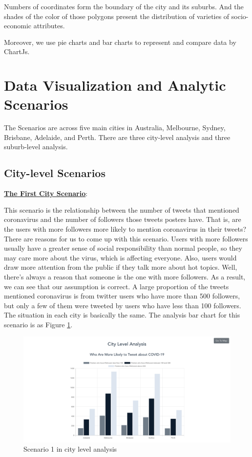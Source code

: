 \documentclass{article}
\begin{document}
Numbers of coordinates form the boundary of the city and its suburbs. And the shades of the color of those polygons present the distribution of varieties of socio-economic attributes. 

Moreover, we use pie charts and bar charts to represent and compare data by ChartJs.

\section{Data Visualization and Analytic Scenarios}
The Scenarios are across five main cities in Australia, Melbourne, Sydney, Brisbane, Adelaide, and Perth. There are three city-level analysis and three suburb-level analysis.
\subsection{City-level Scenarios}
\textbf{\underline{The First City Scenario}}: 

This scenario is the relationship between the number of tweets that mentioned coronavirus and the number of followers those tweets posters have. That is, are the users with more followers more likely to mention coronavirus in their tweets? There are reasons for us to come up with this scenario. Users with more followers usually have a greater sense of social responsibility than normal people, so they may care more about the virus, which is affecting everyone. Also, users would draw more attention from the public if they talk more about hot topics. Well, there’s always a reason that someone is the one with more followers. As a result, we can see that our assumption is correct. A large proportion of the tweets mentioned coronavirus is from twitter users who have more than 500 followers, but only a few of them were tweeted by users who have less than 100 followers. The situation in each city is basically the same. The analysis bar chart for this scenario is as Figure
\ref{fig:Covid-19}. 

\begin{figure}[htp]
\centering
\includegraphics[width=\textwidth]{img/Covid-19.png}
\caption{Scenario 1 in city level analysis}
\label{fig:Covid-19}
\end{figure}
\end{document}
